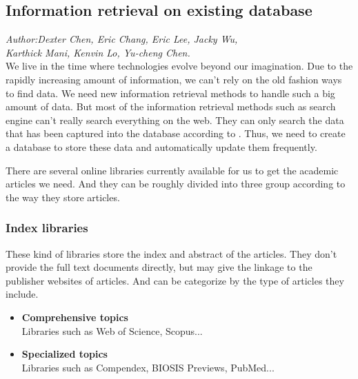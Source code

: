	
\subsection{Information retrieval on existing database}
\textit{\footnotesize Author:Dexter Chen, Eric Chang, Eric Lee, Jacky Wu,\\ 
	Karthick Mani, Kenvin Lo, Yu-cheng Chen.}\\

We live in the time where technologies evolve beyond our imagination. Due to the rapidly increasing amount of information, we can't rely on the old fashion ways to find data. We need new information retrieval methods to handle such a big amount of data. But most of the information retrieval methods such as search engine can't really search everything on the web. They can only search the data that has been captured into the database according to \cite{Grehan}. Thus, we need to create a database to store these data and automatically update them frequently.

There are several online libraries currently available for us to get the academic articles we need. And they can be roughly divided into three group according to the way they store articles.
\subsubsection*{Index libraries}	
	These kind of libraries store the index and abstract of the articles. They don't provide the full text documents directly, but may give the linkage to the publisher websites of articles. And can be categorize by the type of articles they include.
	\begin{itemize}
		\item\textbf{Comprehensive topics}\\Libraries such as Web of Science, Scopus...
		\item\textbf{Specialized topics}\\Libraries such as Compendex, BIOSIS Previews, PubMed...
	\end{itemize}
